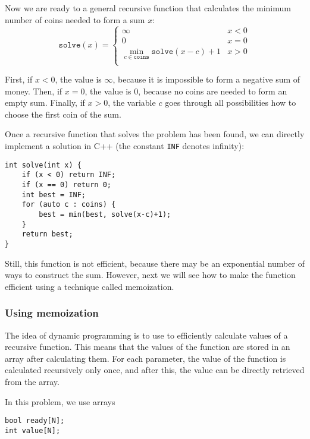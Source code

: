 Now we are ready to a general recursive function
that calculates the minimum number of
coins needed to form a sum $x$:
\begin{equation*}
    \texttt{solve}(x) = \begin{cases}
               \infty               & x < 0\\
               0               & x = 0\\
               \min_{c \in \texttt{coins}} \texttt{solve}(x-c)+1 & x > 0 \\
           \end{cases}
\end{equation*}

First, if $x<0$, the value is $\infty$,
because it is impossible to form a negative
sum of money.
Then, if $x=0$, the value is $0$,
because no coins are needed to form an empty sum.
Finally, if $x>0$, the variable $c$ goes through
all possibilities how to choose the first coin
of the sum.

Once a recursive function that solves the problem
has been found,
we can directly implement a solution in C++
(the constant \texttt{INF} denotes infinity):

\begin{lstlisting}
int solve(int x) {
    if (x < 0) return INF;
    if (x == 0) return 0;
    int best = INF;
    for (auto c : coins) {
        best = min(best, solve(x-c)+1);
    }
    return best;
}
\end{lstlisting}

Still, this function is not efficient,
because there may be an exponential number of ways
to construct the sum.
However, next we will see how to make the
function efficient using a technique called memoization.

\subsubsection{Using memoization}


The idea of dynamic programming is to use
 to efficiently calculate
values of a recursive function.
This means that the values of the function
are stored in an array after calculating them.
For each parameter, the value of the function
is calculated recursively only once, and after this,
the value can be directly retrieved from the array.

In this problem, we use arrays
\begin{lstlisting}
bool ready[N];
int value[N];
\end{lstlisting}

